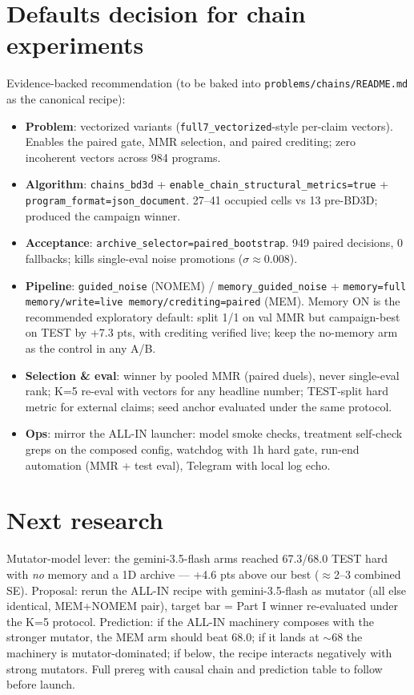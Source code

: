 \documentclass[10pt]{article}
\begin{document}
\section*{Defaults decision for chain experiments}
Evidence-backed recommendation (to be baked into \texttt{problems/chains/README.md}
as the canonical recipe):
\begin{itemize}
\item \textbf{Problem}: vectorized variants (\texttt{full7\_vectorized}-style
per-claim vectors). Enables the paired gate, MMR selection, and paired crediting;
zero incoherent vectors across 984 programs.
\item \textbf{Algorithm}: \texttt{chains\_bd3d} + \texttt{enable\_chain\_structural\_metrics=true}
+ \texttt{program\_format=json\_document}. 27--41 occupied cells vs 13 pre-BD3D;
produced the campaign winner.
\item \textbf{Acceptance}: \texttt{archive\_selector=paired\_bootstrap}. 949 paired
decisions, 0 fallbacks; kills single-eval noise promotions ($\sigma \approx 0.008$).
\item \textbf{Pipeline}: \texttt{guided\_noise} (NOMEM) / \texttt{memory\_guided\_noise}
+ \texttt{memory=full memory/write=live memory/crediting=paired} (MEM). Memory ON is
the recommended exploratory default: split 1/1 on val MMR but campaign-best on TEST
by +7.3 pts, with crediting verified live; keep the no-memory arm as the control in
any A/B.
\item \textbf{Selection \& eval}: winner by pooled MMR (paired duels), never
single-eval rank; K=5 re-eval with vectors for any headline number; TEST-split hard
metric for external claims; seed anchor evaluated under the same protocol.
\item \textbf{Ops}: mirror the ALL-IN launcher: model smoke checks, treatment
self-check greps on the composed config, watchdog with 1h hard gate, run-end
automation (MMR + test eval), Telegram with local log echo.
\end{itemize}

\section*{Next research}
Mutator-model lever: the gemini-3.5-flash arms reached 67.3/68.0 TEST hard with
\emph{no} memory and a 1D archive --- +4.6 pts above our best ($\approx$2--3
combined SE). Proposal: rerun the
ALL-IN recipe with gemini-3.5-flash as mutator (all else identical, MEM+NOMEM pair),
target bar = Part I winner re-evaluated under the K=5 protocol. Prediction: if the
ALL-IN machinery composes with the stronger mutator, the MEM arm should beat 68.0;
if it lands at $\sim$68 the machinery is mutator-dominated; if below, the recipe
interacts negatively with strong mutators. Full prereg with causal chain and
prediction table to follow before launch.
\end{document}
